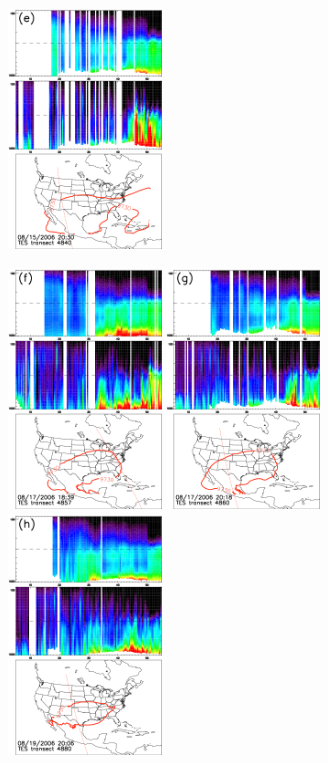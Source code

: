 \begin{figure}
\begin{center}
		\includegraphics[width=1.6in]{co/co_4840_ftuv}
		
		\includegraphics[width=1.6in]{co/co_4857_ftuv}
		\includegraphics[width=1.6in]{co/co_4860_ftuv}
		\includegraphics[width=1.6in]{co/co_4880_ftuv}

\end{center}
\end{figure}
